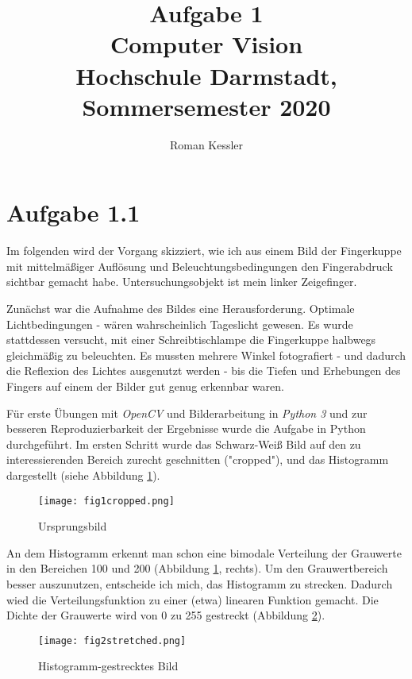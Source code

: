 \documentclass{article}
\begin{document}
\title{Aufgabe 1 \\
		\large Computer Vision \\
    		Hochschule Darmstadt, Sommersemester 2020}

\author{Roman Kessler}

\maketitle

\section*{Aufgabe 1.1}
Im folgenden wird der Vorgang skizziert, wie ich aus einem Bild der Fingerkuppe mit mittelmäßiger Auflösung und Beleuchtungsbedingungen den Fingerabdruck sichtbar gemacht habe. Untersuchungsobjekt ist mein linker Zeigefinger.

Zunächst war die Aufnahme des Bildes eine Herausforderung. Optimale Lichtbedingungen - wären wahrscheinlich Tageslicht gewesen. Es wurde stattdessen versucht, mit einer Schreibtischlampe die Fingerkuppe halbwegs gleichmäßig zu beleuchten. Es mussten mehrere Winkel fotografiert - und dadurch die Reflexion des Lichtes ausgenutzt werden - bis die Tiefen und Erhebungen des Fingers auf einem der Bilder gut genug erkennbar waren. 

Für erste Übungen mit \textit{OpenCV} und Bilderarbeitung in \textit{Python 3} und zur besseren Reproduzierbarkeit der Ergebnisse wurde die Aufgabe in Python durchgeführt.
Im ersten Schritt wurde das Schwarz-Weiß Bild auf den zu interessierenden Bereich zurecht geschnitten ("cropped"), und das Histogramm dargestellt (siehe Abbildung \ref{fig:fig1}).

\begin{figure}
    \centering
    \texttt{[image: fig1cropped.png]}
    \caption{Ursprungsbild}
    \label{fig:fig1}
\end{figure}

An dem Histogramm erkennt man schon eine bimodale Verteilung der Grauwerte in den Bereichen 100 und 200 (Abbildung \ref{fig:fig1}, rechts). Um den Grauwertbereich besser auszunutzen, entscheide ich mich, das Histogramm zu strecken. Dadurch wied die Verteilungsfunktion zu einer (etwa) linearen Funktion gemacht. Die Dichte der Grauwerte wird von 0 zu 255 gestreckt (Abbildung \ref{fig:fig2}).

\begin{figure}
    \centering
    \texttt{[image: fig2stretched.png]}
    \caption{Histogramm-gestrecktes Bild}
    \label{fig:fig2}
\end{figure}
\end{document}
